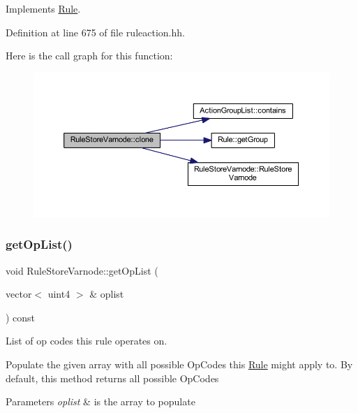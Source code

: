 Implements \mbox{\hyperlink{class_rule_a70de90a76461bfa7ea0b575ce3c11e4d}{Rule}}.



Definition at line 675 of file ruleaction.\+hh.

Here is the call graph for this function\+:
\nopagebreak
\begin{figure}[H]
\begin{center}
\leavevmode
\includegraphics[width=350pt]{class_rule_store_varnode_a8791c49e017c00b88b6d449050762b43_cgraph}
\end{center}
\end{figure}
\mbox{\label{class_rule_store_varnode_a99d44676a0cc44827c2e237655f59a0e}} 
\subsubsection{\texorpdfstring{getOpList()}{getOpList()}}
{\footnotesize\ttfamily void Rule\+Store\+Varnode\+::get\+Op\+List (\begin{DoxyParamCaption}\item[{vector$<$ uint4 $>$ \&}]{oplist }\end{DoxyParamCaption}) const\hspace{0.3cm}{\ttfamily [virtual]}}



List of op codes this rule operates on. 

Populate the given array with all possible Op\+Codes this \mbox{\hyperlink{class_rule}{Rule}} might apply to. By default, this method returns all possible Op\+Codes 
\begin{DoxyParams}{Parameters}
{\em oplist} & is the array to populate \\
\hline
\end{DoxyParams}


